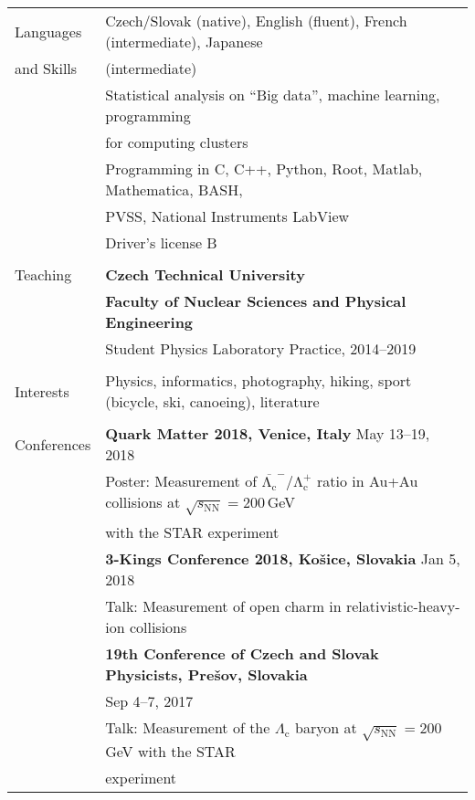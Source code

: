 \documentclass[a4paper,11pt,oneside]{article}
\begin{document}
\newpage

\noindent  \begin{tabular}{@{} l l}
  \Large{Languages}   & Czech/Slovak (native), English (fluent), French (intermediate), Japanese \\
\Large{and Skills}    & (intermediate)  \\[.2cm]
     & Statistical analysis on ``Big data'', machine learning, programming \\
     & for computing clusters\\[.2cm]
     & Programming in C, C++, Python, Root, Matlab, Mathematica, BASH,  \\
     & PVSS, National Instruments LabView \\[.2cm]
     & Driver's license B\\
     \\
  \Large{Teaching}  & \textbf{Czech Technical University} \\
     & \textbf{Faculty of Nuclear Sciences and Physical Engineering} \\
     & Student Physics Laboratory Practice, 2014--2019\\
     \\
\Large{Interests}    
     & Physics, informatics, photography, hiking, sport (bicycle, ski, canoeing), literature \\
     \\[.2cm]
\Large{Conferences}
     & \textbf{Quark Matter 2018, Venice, Italy} May 13--19, 2018 \\
     & Poster: Measurement of $\mathrm{\overline{\Lambda_c}^-/\Lambda_c^+}$ ratio in Au+Au collisions at $\sqrt{s_\mathrm{NN}} = 200\,$GeV\\
     &with the STAR experiment \\[.2cm]
     & \textbf{3-Kings Conference 2018, Košice, Slovakia} Jan 5, 2018 \\
     & Talk: Measurement of open charm in relativistic-heavy-ion collisions \\[.2cm]
     & \textbf{19th Conference of Czech and Slovak Physicists, Prešov, Slovakia}\\
     & Sep 4--7, 2017 \\
     & Talk: Measurement of the $\Lambda_\mathrm{c}$ baryon at $\sqrt{s_\mathrm{NN}} = 200\,$GeV with the STAR \\
     & experiment\\[.2cm]

\end{tabular}
\end{document}

